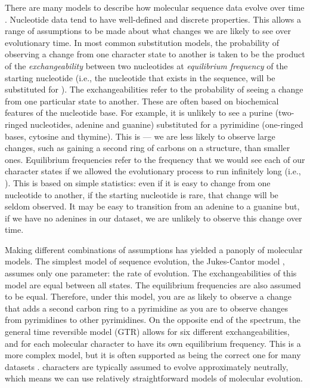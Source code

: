 There are many models to describe how molecular sequence data evolve over time \citep{Jukes1969, Kimura1980, Felsenstein1981, Hasegawa1985, Tavare1986}.
Nucleotide data tend to have well-defined and discrete properties.
This allows a range of assumptions to be made about what changes we are likely to see over evolutionary time.
In most common  substitution models, the probability of observing a change from one character state to another is taken to be the product of the \textit{exchangeability} between two nucleotides at \textit{equilibrium frequency} of the starting nucleotide (i.e., the nucleotide that exists in the sequence,  will be substituted for ). 
The exchangeabilities refer to the probability of seeing a change from one particular state to another.
These are often based on biochemical features of the nucleotide base.
For example, it is unlikely to see a purine (two-ringed nucleotides, adenine and guanine) substituted for a pyrimidine (one-ringed bases, cytosine and thymine). 
This is  --- we are less likely to observe large changes, such as gaining a second ring of carbons on a structure, than smaller ones.
Equilibrium frequencies refer to the frequency that we would see each of our character states if we allowed the evolutionary process to run infinitely long (i.e., ).
This is based on simple statistics: even if it is easy to change from one nucleotide to another, if the starting nucleotide is rare, that change will be seldom observed.
It may be easy to transition from an adenine to a guanine but, if we have no adenines in our dataset, we are unlikely to observe this change over time.

Making different combinations of assumptions has yielded a panoply of molecular models.
The simplest model of sequence evolution, the Jukes-Cantor model \citep{Jukes1969}, assumes only one parameter: the rate of evolution.
The exchangeabilities of this model are equal between all states. 
The equilibrium frequencies are also assumed to be equal.
Therefore, under this model, you are as likely to observe a change that adds a second carbon ring to a pyrimidine as you are to observe changes from pyrimidines to other pyrimidines.
On the opposite end of the spectrum, the general time reversible model (GTR) \citep{Tavare1986} allows for six different exchangeabilities, and for each molecular character to have its own equilibrium frequency.
This is a more complex model, but it is often supported as being the correct one for many datasets \citep{abadi2019}.
 characters are typically assumed to evolve approximately neutrally, which means we can use relatively straightforward models of molecular evolution.

